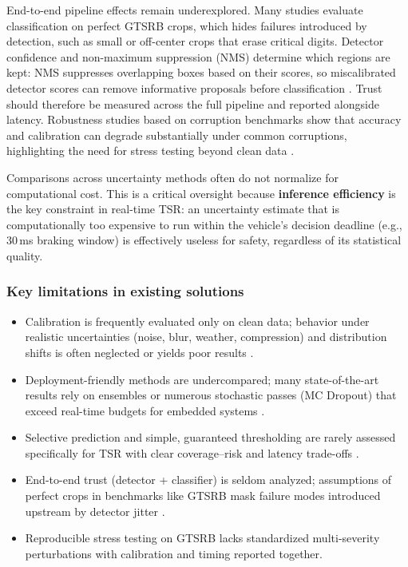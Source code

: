 \documentclass[11pt,a4paper]{article}
\begin{document}
End-to-end pipeline effects remain underexplored. Many studies evaluate classification on perfect GTSRB crops, which hides failures introduced by detection, such as small or off-center crops that erase critical digits. Detector confidence and non-maximum suppression (NMS) determine which regions are kept: NMS suppresses overlapping boxes based on their scores, so miscalibrated detector scores can remove informative proposals before classification \cite{neubeck2006nms}. Trust should therefore be measured across the full pipeline and reported alongside latency. Robustness studies based on corruption benchmarks show that accuracy and calibration can degrade substantially under common corruptions, highlighting the need for stress testing beyond clean data \cite{hendrycks2019imagenetc}.

Comparisons across uncertainty methods often do not normalize for computational cost. This is a critical oversight because \textbf{inference efficiency} is the key constraint in real-time TSR: an uncertainty estimate that is computationally too expensive to run within the vehicle's decision deadline (e.g., 30\,ms braking window) is effectively useless for safety, regardless of its statistical quality.

\subsubsection*{Key limitations in existing solutions}

\begin{itemize}
  \item Calibration is frequently evaluated only on clean data; behavior under realistic uncertainties (noise, blur, weather, compression) and distribution shifts is often neglected or yields poor results \cite{ovadia2019can, hendrycks2019imagenetc}.
  \item Deployment-friendly methods are undercompared; many state-of-the-art results rely on ensembles or numerous stochastic passes (MC Dropout) that exceed real-time budgets for embedded systems \cite{lakshminarayanan2017simple, gal2016dropout}.
  \item Selective prediction and simple, guaranteed thresholding are rarely assessed specifically for TSR with clear coverage–risk and latency trade-offs \cite{geifman2019selectivenet}.
  \item End-to-end trust (detector + classifier) is seldom analyzed; assumptions of perfect crops in benchmarks like GTSRB mask failure modes introduced upstream by detector jitter \cite{stallkamp2011gtsrb}.
  \item Reproducible stress testing on GTSRB lacks standardized multi-severity perturbations with calibration and timing reported together.
\end{itemize}
\end{document}

